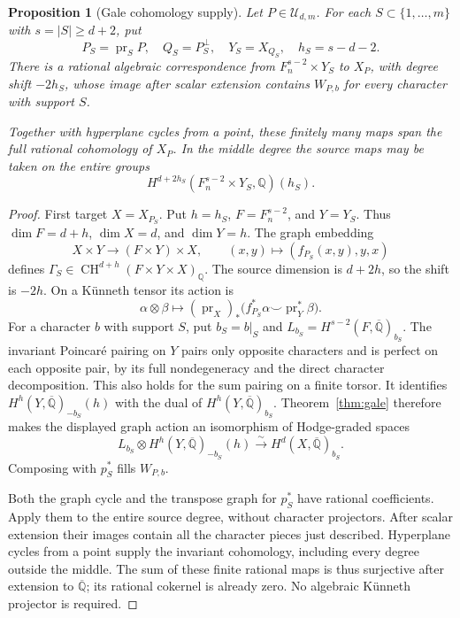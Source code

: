 \documentclass[11pt]{article}
\newcommand{\Q}{\mathbb Q}
\newcommand{\CH}{\operatorname{CH}}
\newcommand{\pr}{\operatorname{pr}}
\newcommand{\kk}{\overline{\Q}}
\newcommand{\U}{\mathcal U}
\theoremstyle{plain}
\newtheorem{proposition}[theorem]{Proposition}
\theoremstyle{definition}
\theoremstyle{remark}
\numberwithin{equation}{section}
\begin{document}
\begin{proposition}[Gale cohomology supply]\label{prop:supply}
Let \(P\in\U_{d,m}\).  For each \(S\subset\{1,\ldots,m\}\)
with \(s=|S|\geq d+2\), put
\[
 P_S=\pr_S P,\quad Q_S=P_S^\perp,\quad Y_S=X_{Q_S},
 \quad h_S=s-d-2.
\]
There is a rational algebraic correspondence from
\(F_n^{s-2}\times Y_S\) to \(X_P\), with degree shift
\(-2h_S\), whose image after scalar extension contains
\(W_{P,b}\) for every character with support \(S\).

Together with hyperplane cycles from a point, these finitely many
maps span the full rational cohomology of \(X_P\).  In the middle
degree the source maps may be taken on the entire groups
\[
 H^{d+2h_S}(F_n^{s-2}\times Y_S,\Q)(h_S).
\]
\end{proposition}
\begin{proof}
First target \(X=X_{P_S}\).  Put \(h=h_S\), \(F=F_n^{s-2}\),
and \(Y=Y_S\).  Thus \(\dim F=d+h\), \(\dim X=d\), and
\(\dim Y=h\).
The graph embedding
\[
 X\times Y\longrightarrow(F\times Y)\times X,\qquad
 (x,y)\longmapsto(f_{P_S}(x,y),y,x)
\]
defines \(\Gamma_S\in\CH^{d+h}(F\times Y\times X)_\Q\).
The source dimension is \(d+2h\), so the shift is \(-2h\).
On a K\"unneth tensor its action is
\[
 \alpha\otimes\beta\longmapsto
 (\pr_X)_*\bigl(f_{P_S}^*\alpha\smile\pr_Y^*\beta\bigr).
\]
For a character \(b\) with support \(S\), put \(b_S=b|_S\) and
\(L_{b_S}=H^{s-2}(F,\kk)_{b_S}\).
The invariant Poincar\'{e} pairing on \(Y\) pairs only opposite
characters and is perfect on each opposite pair, by its full
nondegeneracy and the direct character decomposition.  This also
holds for the sum pairing on a finite torsor.  It identifies
\(H^h(Y,\kk)_{-b_S}(h)\) with the dual of
\(H^h(Y,\kk)_{b_S}\).  Theorem~\ref{thm:gale} therefore makes the
displayed graph action an isomorphism of Hodge-graded spaces
\[
 L_{b_S}\otimes H^h(Y,\kk)_{-b_S}(h)
 \xrightarrow{\;\sim\;} H^d(X,\kk)_{b_S}.
\]
Composing with \(p_S^*\) fills \(W_{P,b}\).

Both the graph cycle and the transpose graph for \(p_S^*\) have
rational coefficients.  Apply them to the entire source degree,
without character projectors.  After scalar extension their images
contain all the character pieces just described.  Hyperplane cycles
from a point supply the invariant cohomology, including every degree
outside the middle.  The sum of these finite rational maps is thus
surjective after extension to \(\kk\); its rational cokernel is
already zero.  No algebraic K\"unneth projector is required.
\end{proof}
\end{document}
